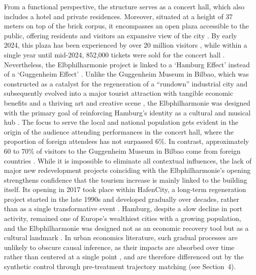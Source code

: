 \documentclass[a4paper, 12pt]{article}
\begin{document}
From a functional perspective, the structure serves as a concert hall, which also includes a hotel and private residences. Moreover, situated at a height of 37 meters on top of the brick corpus, it encompasses an open plaza accessible to the public, offering residents and visitors an expansive view of the city \citep{holz2023}. By early 2024, this plaza has been experienced by over 20 million visitors \citep{dpa2024}, while within a single year until mid-2024, 852,000 tickets were sold for the concert hall \citep{holz2024}. Nevertheless, the Elbphilharmonie project is linked to a `Hamburg Effect' instead of a `Guggenheim Effect' \citep{heuer2022}. Unlike the Guggenheim Museum in Bilbao, which was constructed as a catalyst for the regeneration of a ``rundown'' \citep[p.~1441]{heidenreich2015} industrial city and subsequently evolved into a major tourist attraction with tangible economic benefits and a thriving art and creative scene \citep{plaza2009}, the Elbphilharmonie was designed with the primary goal of reinforcing Hamburg's identity as a cultural and musical hub \citep{heuer2022}. The focus to serve the local and national population gets evident in the origin of the audience attending performances in the concert hall, where the proportion of foreign attendees has not surpassed 6\%. In contrast, approximately 60 to 70\% of visitors to the Guggenheim Museum in Bilbao come from foreign countries \citep[p.~97]{heuer2022}. While it is impossible to eliminate all contextual influences, the lack of major new redevelopment projects coinciding with the Elbphilharmonie's opening strengthens confidence that the tourism increase is mainly linked to the building itself. Its opening in 2017 took place within HafenCity, a long-term regeneration project started in the late 1990s and developed gradually over decades, rather than as a single transformative event \citep{landis2022}. Hamburg, despite a slow decline in port activity, remained one of Europe's wealthiest cities with a growing population, and the Elbphilharmonie was designed not as an economic recovery tool but as a cultural landmark \citep[p.~96]{heuer2022}. In urban economics literature, such gradual processes are unlikely to obscure causal inference, as their impacts are absorbed over time rather than centered at a single point \citep{baum-snow2015, sun2023}, and are therefore differenced out by the synthetic control through pre-treatment trajectory matching (see Section~4).
\end{document}
